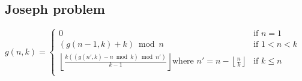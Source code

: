 \subsection{Joseph problem}
${\displaystyle g(n,k)={\begin{cases}
 0 & {\text{if }}n=1\\
 (g(n-1,k)+k){\bmod {n}}&{\text{if }} 1<n<k\\
 \left\lfloor {\frac {k((g(n',k)-n{\bmod {k}}){\bmod {n}}')}{k-1}}\right\rfloor {\text{where }}n'=n-\left\lfloor {\frac {n}{k}}\right\rfloor &{\text{if }}k\leq n\\
 \end{cases}}}$\\
\hrulefill